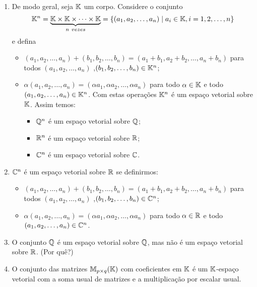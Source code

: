 \begin{exemplo}
\begin{enumerate}[label={\arabic*})]
		\item De modo geral, seja $\mathbb{K}$ um corpo. Considere o conjunto
		\[
			\mathbb{K}^n = \underbrace{\mathbb{K} \times \mathbb{K} \times \cdots \times \mathbb{K}}_{n\ vezes} = \{(a_1, a_2,\dots,a_n) \mid a_i \in \mathbb{K}, i =1, 2, \dots, n\}
		\]
		e defina
		\begin{itemize}
			\item $(a_1, a_2, \dots, a_n) + (b_1, b_2, \dots,b_n) = (a_1 + b_1, a_2 + b_2,\dots, a_n + b_n)$ para todos $(a_1, a_2, \dots,a_n)$ ,$(b_1, b_2, \dots,b_n) \in \mathbb{K}^n$;
			\item $\alpha (a_1, a_2, \dots,a_n) = (\alpha a_1, \alpha a_2, \dots, \alpha a_n)$ para todo $\alpha \in \mathbb{K}$ e todo $(a_1, a_2, \dots, a_n) \in \mathbb{K}^n$.
			Com estas opera\c{c}\~oes $\mathbb{K}^n$ \'e um espa\c{c}o vetorial sobre $\mathbb{K}$. Assim temos:
			\begin{itemize}
				\item $\mathbb{Q}^n$ \'e um espa\c{c}o vetorial sobre $\mathbb{Q}$;
				\item $\mathbb{R}^n$ \'e um espa\c{c}o vetorial sobre $\mathbb{R}$;
				\item $\mathbb{C}^n$ \'e um espa\c{c}o vetorial sobre $\mathbb{C}$.
			\end{itemize}
		\end{itemize}

		\item $\mathbb{C}^n$ \'e um espa\c{c}o vetorial sobre $\mathbb{R}$ se definirmos:
		\begin{itemize}
			\item $(a_1, a_2, \dots, a_n) + (b_1, b_2, \dots,b_n) = (a_1 + b_1, a_2 + b_2,\dots, a_n + b_n)$ para todos $(a_1, a_2, \dots,a_n)$ ,$(b_1, b_2, \dots,b_n) \in \mathbb{C}^n$;
			\item $\alpha (a_1, a_2, \dots,a_n) = (\alpha a_1, \alpha a_2, \dots, \alpha a_n)$ para todo $\alpha \in \mathbb{R}$ e todo $(a_1, a_2, \dots, a_n) \in \mathbb{C}^n$.
		\end{itemize}
		
		\item O conjunto $\mathbb{Q}$ \'e um espa\c{c}o vetorial sobre $\mathbb{Q}$, mas n\~ao \'e um espa\c{c}o vetorial sobre $\mathbb{R}$. (Por qu\^e?)
		
		\item O conjunto das matrizes $\mathbb{M}_{p \times q}(\mathbb{K})$ com coeficientes em $\mathbb{K}$ \'e um $\mathbb{K}$-espa\c{c}o vetorial com a soma usual de matrizes e a multiplica\c{c}\~ao por escalar usual.
		

\end{enumerate}
\end{exemplo}
